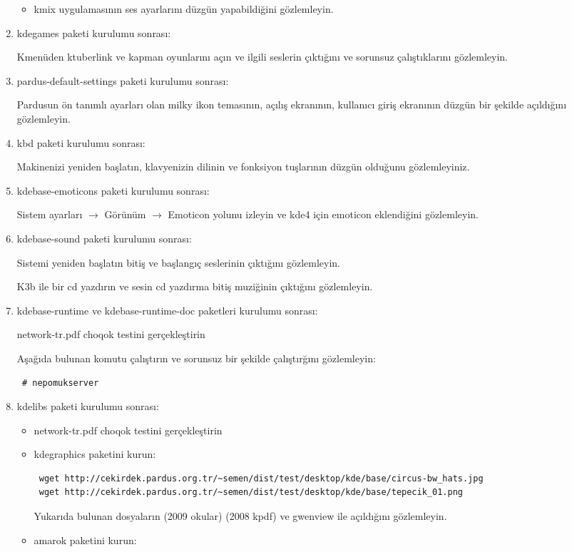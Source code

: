 \documentclass[a4paper,10pt]{article}
\begin{document}
\begin{enumerate}
\begin{itemize}
\item kmix uygulamasının ses ayarlarını düzgün yapabildiğini gözlemleyin.

\end{itemize}


\item kdegames paketi kurulumu sonrası:

Kmenüden ktuberlink ve kapman oyunlarını açın ve ilgili seslerin çıktığını ve sorunsuz çalıştıklarını gözlemleyin.

\item pardus-default-settings paketi kurulumu sonrası:

Pardusun ön tanımlı ayarları olan milky ikon temasının, açılış ekranının, kullanıcı giriş ekranının düzgün bir şekilde açıldığını gözlemleyin.

\item kbd paketi kurulumu sonrası:

Makinenizi yeniden başlatın, klavyenizin dilinin ve fonksiyon tuşlarının düzgün olduğunu gözlemleyiniz. 
\item kdebase-emoticons paketi kurulumu sonrası:

Sistem ayarları $\rightarrow$ Görünüm $\rightarrow$ Emoticon yolunu izleyin ve kde4 için emoticon eklendiğini gözlemleyin.
\item kdebase-sound paketi kurulumu sonrası:

Sistemi yeniden başlatın bitiş ve başlangıç seslerinin çıktığını gözlemleyin.

K3b ile bir cd yazdırın ve sesin cd yazdırma bitiş muziğinin çıktığını gözlemleyin.
\item kdebase-runtime ve kdebase-runtime-doc paketleri kurulumu sonrası:

network-tr.pdf choqok testini gerçekleştirin

Aşağıda bulunan komutu çalıştırın ve sorunsuz bir şekilde çalıştırğını gözlemleyin:
\begin{verbatim}
 # nepomukserver
\end{verbatim}

 \item kdelibs paketi kurulumu sonrası:
\begin{itemize}
 \item network-tr.pdf choqok testini gerçekleştirin


 \item kdegraphics paketini kurun:
\begin{verbatim}	
 wget http://cekirdek.pardus.org.tr/~semen/dist/test/desktop/kde/base/circus-bw_hats.jpg
 wget http://cekirdek.pardus.org.tr/~semen/dist/test/desktop/kde/base/tepecik_01.png
\end{verbatim}
Yukarıda bulunan dosyaların (2009 okular) (2008 kpdf) ve gwenview ile açıldığını gözlemleyin.
\item amarok paketini kurun:


\end{itemize}
\end{enumerate}
\end{document}

